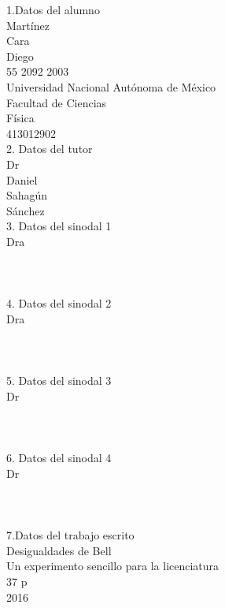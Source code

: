 \documentclass[12pt,twoside]{article}
\begin{document}
1.Datos del alumno\\
Martínez\\
Cara\\
Diego\\
55 2092 2003\\
Universidad Nacional Autónoma de México\\
Facultad de Ciencias \\
Física\\
413012902
\vspace{0.2cm}\\
2. Datos del tutor\\
Dr\\
Daniel\\
Sahagún\\
Sánchez
\vspace{0.2cm}\\
3. Datos del sinodal 1\\
Dra\\
\\
\\
\vspace{0.2cm}\\
4. Datos del sinodal 2 \\
Dra\\
\\
\\
\vspace{0.2cm}\\
5. Datos del sinodal 3 \\ 
Dr\\
\\
\\
\vspace{0.2cm}\\
6. Datos del sinodal 4 \\
Dr\\
\\
\\
\vspace{0.2cm}\\
7.Datos del trabajo escrito\\
Desigualdades de Bell\\
Un experimento sencillo para la licenciatura\\
37 p\\
2016


\clearpage

\section*{}
\end{document}
